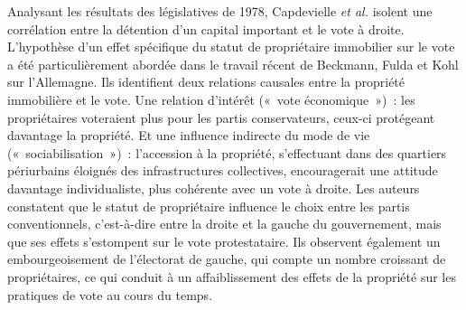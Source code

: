 \documentclass[a4paper,14pt]{article}
\begin{document}
\begin{multicols}{2}
Analysant les résultats des législatives de 1978, Capdevielle \textit{et al.} \parencite{capdevielle_france_1998} isolent une corrélation entre la détention d'un capital important et le vote à droite. L'hypothèse d'un effet spécifique du statut de propriétaire immobilier sur le vote a été particulièrement abordée dans le travail récent de Beckmann, Fulda et Kohl \parencite{beckmann_housing_2020} sur l'Allemagne. Ils identifient deux relations causales entre la propriété immobilière et le vote. Une relation d'intérêt («~vote économique~»)~: les propriétaires voteraient plus pour les partis conservateurs, ceux-ci protégeant davantage la propriété. Et une influence indirecte du mode de vie («~sociabilisation~»)~: l'accession à la propriété, s'effectuant dans des quartiers périurbains éloignés des infrastructures collectives, encouragerait une attitude davantage individualiste, plus cohérente avec un vote à droite. Les auteurs constatent que le statut de propriétaire influence le choix entre les partis conventionnels, c'est-à-dire entre la droite et la gauche du gouvernement, mais que ses effets s'estompent sur le vote protestataire. Ils observent également un embourgeoisement de l'électorat de gauche, qui compte un nombre croissant de propriétaires, ce qui conduit à un affaiblissement des effets de la propriété sur les pratiques de vote au cours du temps.



\end{multicols}
\end{document}
